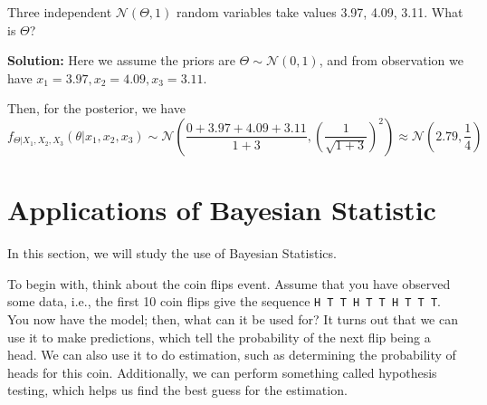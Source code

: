 \begin{eg}
  Three independent \(\mathcal{N}(\Theta, 1)\) random variables take values 3.97, 4.09, 3.11. What is \(\Theta\)? 
  
  \textbf{Solution:} 
  Here we assume the priors are \(\Theta \sim \mathcal{N} (0, 1)\), and from observation we have \(x_1 = 3.97, x_2 = 4.09, x_3 = 3.11\). 

  Then, for the posterior, we have 
  \[
    f_{\Theta \vert X_1, X_2, X_3} (\theta \vert x_1, x_2, x_3) \sim \mathcal{N} \left(\dfrac{0 + 3.97 + 4.09 + 3.11}{1 + 3}, \left(\dfrac{1}{\sqrt{1 + 3}}\right)^2\right) \approx \mathcal{N} (2.79, \dfrac{1}{4})
  \]
\end{eg}

\section{Applications of Bayesian Statistic}
In this section, we will study the use of Bayesian Statistics.

To begin with, think about the coin flips event. Assume that you have observed some data, i.e., the first 10 coin flips give the sequence \verb|H T T H T T H T T T|. You now have the model; then, what can it be used for? It turns out that we can use it to make predictions, which tell the probability of the next flip being a head. We can also use it to do estimation, such as determining the probability of heads for this coin. Additionally, we can perform something called hypothesis testing, which helps us find the best guess for the estimation.

